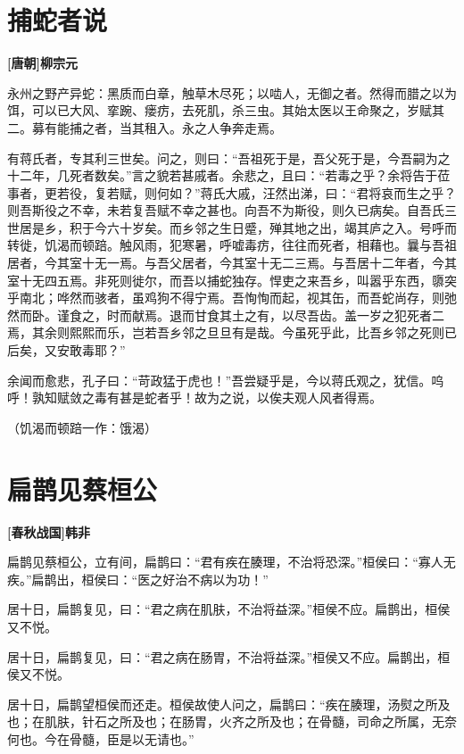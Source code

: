 \documentclass[UTF8,titlepage,oneside]{ctexbook}
\begin{document}
\chapter*{捕蛇者说}
\begin{center}
	\textbf{[唐朝]柳宗元}
\end{center}

永州之野产异蛇：黑质而白章，触草木尽死；以啮人，无御之者。然得而腊之以为饵，可以已大风、挛踠、瘘疠，去死肌，杀三虫。其始太医以王命聚之，岁赋其二。募有能捕之者，当其租入。永之人争奔走焉。

有蒋氏者，专其利三世矣。问之，则曰：“吾祖死于是，吾父死于是，今吾嗣为之十二年，几死者数矣。”言之貌若甚戚者。余悲之，且曰：“若毒之乎？余将告于莅事者，更若役，复若赋，则何如？”蒋氏大戚，汪然出涕，曰：“君将哀而生之乎？则吾斯役之不幸，未若复吾赋不幸之甚也。向吾不为斯役，则久已病矣。自吾氏三世居是乡，积于今六十岁矣。而乡邻之生日蹙，殚其地之出，竭其庐之入。号呼而转徙，饥渴而顿踣。触风雨，犯寒暑，呼嘘毒疠，往往而死者，相藉也。曩与吾祖居者，今其室十无一焉。与吾父居者，今其室十无二三焉。与吾居十二年者，今其室十无四五焉。非死则徙尔，而吾以捕蛇独存。悍吏之来吾乡，叫嚣乎东西，隳突乎南北；哗然而骇者，虽鸡狗不得宁焉。吾恂恂而起，视其缶，而吾蛇尚存，则弛然而卧。谨食之，时而献焉。退而甘食其土之有，以尽吾齿。盖一岁之犯死者二焉，其余则熙熙而乐，岂若吾乡邻之旦旦有是哉。今虽死乎此，比吾乡邻之死则已后矣，又安敢毒耶？”

余闻而愈悲，孔子曰：“苛政猛于虎也！”吾尝疑乎是，今以蒋氏观之，犹信。呜呼！孰知赋敛之毒有甚是蛇者乎！故为之说，以俟夫观人风者得焉。

（饥渴而顿踣一作：饿渴）


\chapter*{扁鹊见蔡桓公}
\begin{center}
	\textbf{[春秋战国]韩非}
\end{center}

扁鹊见蔡桓公，立有间，扁鹊曰：“君有疾在腠理，不治将恐深。”桓侯曰：“寡人无疾。”扁鹊出，桓侯曰：“医之好治不病以为功！”

居十日，扁鹊复见，曰：“君之病在肌肤，不治将益深。”桓侯不应。扁鹊出，桓侯又不悦。

居十日，扁鹊复见，曰：“君之病在肠胃，不治将益深。”桓侯又不应。扁鹊出，桓侯又不悦。

居十日，扁鹊望桓侯而还走。桓侯故使人问之，扁鹊曰：“疾在腠理，汤熨之所及也；在肌肤，针石之所及也；在肠胃，火齐之所及也；在骨髓，司命之所属，无奈何也。今在骨髓，臣是以无请也。”
\end{document}
